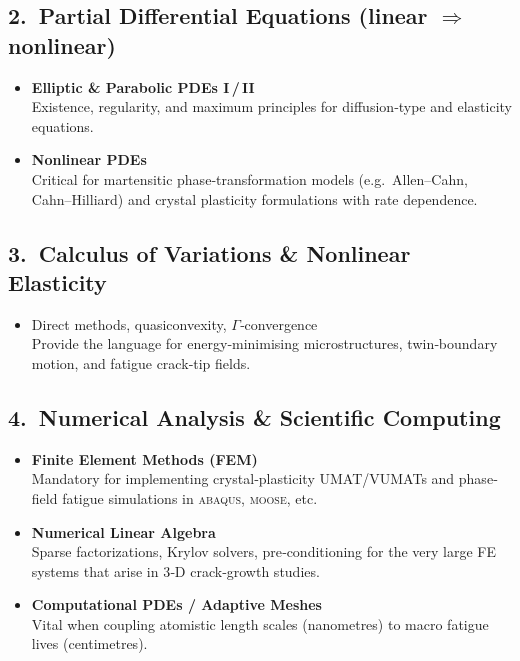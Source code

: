 \documentclass[12pt]{article}
\theoremstyle{definition} %
\theoremstyle{plain} %
\begin{document}
\subsection*{2.\  Partial Differential Equations (linear $\Rightarrow$ nonlinear)}
\begin{itemize}
  \item \textbf{Elliptic \& Parabolic PDEs I\,/\,II}
        \\Existence, regularity, and maximum principles for
        diffusion‐type and elasticity equations.
  \item \textbf{Nonlinear PDEs}
        \\Critical for martensitic phase‐transformation models
        (e.g.\ Allen–Cahn, Cahn–Hilliard) and crystal plasticity
        formulations with rate dependence.
\end{itemize}

\subsection*{3.\  Calculus of Variations \& Nonlinear Elasticity}
\begin{itemize}
  \item Direct methods, quasiconvexity, $\Gamma$‐convergence
        \\Provide the language for energy‐minimising microstructures,
        twin‐boundary motion, and fatigue crack‐tip fields.
\end{itemize}

\subsection*{4.\  Numerical Analysis \& Scientific Computing}
\begin{itemize}
  \item \textbf{Finite Element Methods (FEM)}
        \\Mandatory for implementing crystal‐plasticity UMAT/VUMATs and
        phase‐field fatigue simulations in \textsc{abaqus}, \textsc{moose}, etc.
  \item \textbf{Numerical Linear Algebra}
        \\Sparse factorizations, Krylov solvers, pre‑conditioning for the
        very large FE systems that arise in 3‑D crack‐growth studies.
  \item \textbf{Computational PDEs / Adaptive Meshes}
        \\Vital when coupling atomistic length scales (nanometres) to
        macro fatigue lives (centimetres).
\end{itemize}
\end{document}
